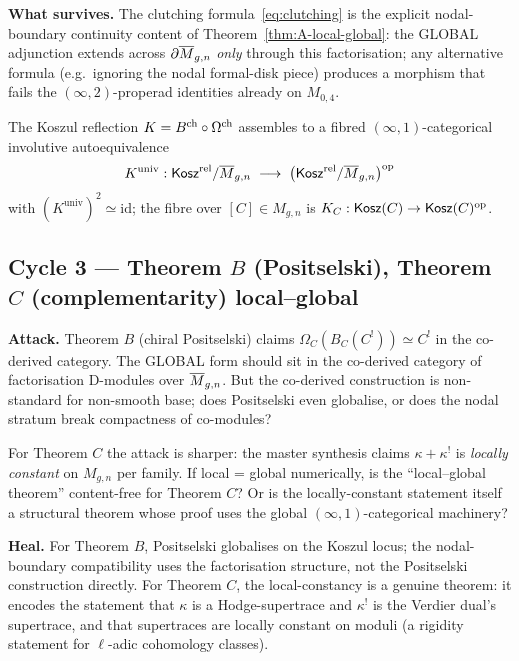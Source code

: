 \textbf{What survives.} The clutching formula~\eqref{eq:clutching} is
the explicit nodal-boundary continuity content of
Theorem~\ref{thm:A-local-global}: the GLOBAL adjunction extends across
$\partial \overline{M}_{g,n}$ \emph{only} through this factorisation; any
alternative formula (e.g.\ ignoring the nodal formal-disk piece)
produces a morphism that fails the $(\infty,2)$-properad identities
already on $M_{0,4}$.

\begin{corollary}\ClaimStatusTheorem
\label{cor:A-fibred-autoequivalence}
The Koszul reflection $K = B^{\mathrm{ch}} \circ \Omega^{\mathrm{ch}}$ assembles to a
fibred $(\infty,1)$-categorical involutive autoequivalence
\[
  K^{\mathrm{univ}}: \mathsf{Kosz}^{\mathrm{rel}}/\overline{M}_{g,n}
  \;\longrightarrow\;
  \big(\mathsf{Kosz}^{\mathrm{rel}}/\overline{M}_{g,n}\big)^{\mathrm{op}}
\]
with $(K^{\mathrm{univ}})^2 \simeq \mathrm{id}$; the fibre over
$[C] \in M_{g,n}$ is $K_C: \mathsf{Kosz}(C) \to \mathsf{Kosz}(C)^{\mathrm{op}}$.
\end{corollary}

\subsection*{Cycle 3 --- Theorem $B$ (Positselski), Theorem $C$
(complementarity) local--global}

\textbf{Attack.} Theorem $B$ (chiral Positselski) claims
$\Omega_C(B_C(C^!)) \simeq C^!$ in the co-derived category. The
GLOBAL form should sit in the co-derived category of factorisation
D-modules over $\overline{M}_{g,n}$. But the co-derived construction is
non-standard for non-smooth base; does Positselski even globalise,
or does the nodal stratum break compactness of co-modules?

For Theorem $C$ the attack is sharper: the master synthesis claims
$\kappa + \kappa^!$ is \emph{locally constant} on $M_{g,n}$ per family.
If local = global numerically, is the ``local--global theorem''
content-free for Theorem $C$? Or is the locally-constant statement
itself a structural theorem whose proof uses the global
$(\infty,1)$-categorical machinery?

\textbf{Heal.} For Theorem $B$, Positselski globalises on the Koszul
locus; the nodal-boundary compatibility uses the factorisation
structure, not the Positselski construction directly. For Theorem $C$,
the local-constancy is a genuine theorem: it encodes the statement
that $\kappa$ is a Hodge-supertrace and $\kappa^!$ is the Verdier dual's
supertrace, and that supertraces are locally constant on moduli (a
rigidity statement for $\ell$-adic cohomology classes).

